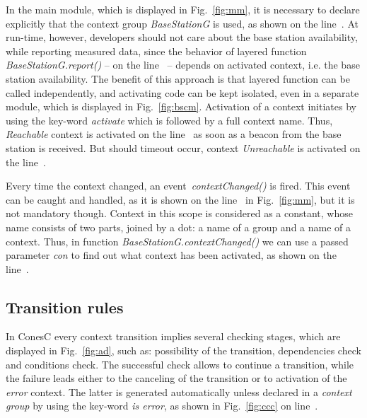 In the main module, which is displayed in Fig.~\ref{fig:mm}, it is necessary to declare
explicitly that the context group \emph{BaseStationG} is used, as shown on the line~.
At run-time, however, developers should not care about the base station availability, while
reporting measured data, since the behavior of layered function
\emph{BaseStationG.report()} -- on the line~ -- depends on activated
context, i.e. the base station availability. The benefit of
this approach is that layered function can be called independently, and activating code
can be kept isolated, even in a separate module, which is displayed in Fig.~\ref{fig:bscm}.
Activation of a context initiates by using the key-word
\emph{activate} which is followed by a full context name. Thus,
\emph{Reachable} context is activated on the line~ as soon as a
beacon from the base station is received. But should timeout occur, context
\emph{Unreachable} is activated on the line~.



Every time the context changed, an event~\emph{contextChanged()} is fired. This event can be
caught and handled, as it is shown on the line~ in Fig.~\ref{fig:mm},
but it is not mandatory though. Context in this scope is considered as a constant,
whose name consists of two parts, joined by a dot: a name of a group and a name
of a context. Thus, in function \emph{BaseStationG.contextChanged()} we can use
a passed parameter \emph{con} to find out what context has been activated, as
shown on the line~.

\subsection{Transition rules}\label{subsec:rules}

In ConesC every context transition implies several checking stages, which are displayed in
Fig.~\ref{fig:ad}, such as: possibility of the transition, dependencies check and conditions
check. The successful check allows to continue a transition, while the failure leads either to
the canceling of the transition or to activation of the \emph{error} context. The latter is generated
automatically unless declared in a \emph{context group} by using the key-word \emph{is error},
as shown in Fig.~\ref{fig:ccc} on line~.

